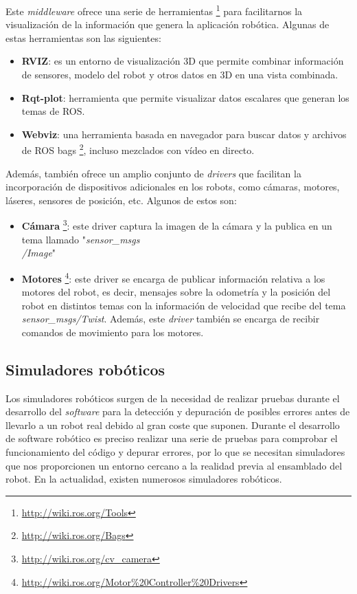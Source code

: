 \documentclass[a4paper, 12pt]{book}
\begin{document}
Este \emph{middleware} ofrece una serie de herramientas \footnote{\url{http://wiki.ros.org/Tools}} para facilitarnos la visualización de la información que genera la aplicación robótica. Algunas de estas herramientas son las siguientes:
\nolinebreak
\begin{itemize}
\itemsep 0em
\item \textbf{RVIZ}: es un entorno de visualización 3D que permite combinar información de sensores, modelo del robot y otros datos en 3D en una vista combinada.
\item \textbf{Rqt-plot}: herramienta que permite visualizar datos escalares que generan los temas de ROS.
\item \textbf{Webviz}: una herramienta basada en navegador para buscar datos y archivos de ROS bags \footnote{\url{http://wiki.ros.org/Bags}}, incluso mezclados con vídeo en directo.
\end{itemize}

Además, también ofrece un amplio conjunto de \emph{drivers} que facilitan la incorporación de dispositivos adicionales en los robots, como cámaras, motores, láseres, sensores de posición, etc. Algunos de estos son:

\begin{itemize}
\itemsep 0em
\item \textbf{Cámara} \footnote{\url{http://wiki.ros.org/cv_camera}}: este driver captura la imagen de la cámara y la publica en un tema llamado "\emph{sensor\_msgs\\/Image}"
\item \textbf{Motores} \footnote{\url{http://wiki.ros.org/Motor\%20Controller\%20Drivers}}: este driver se encarga de publicar información relativa a los motores del robot, es decir, mensajes sobre la odometría y la posición del robot en distintos temas con la información de velocidad que recibe del tema \emph{sensor\_msgs/Twist}. Además, este \emph{driver} también se encarga de recibir comandos de movimiento para los motores.

\end{itemize}

\subsection{Simuladores robóticos}
\label{subsec:simuladores}

Los simuladores robóticos surgen de la necesidad de realizar pruebas durante el desarrollo del \textit{software} para la detección y depuración de posibles errores antes de llevarlo a un robot real debido al gran coste que suponen. Durante el desarrollo de software robótico es preciso realizar una serie de pruebas para comprobar el funcionamiento del código y depurar errores, por lo que se necesitan simuladores que nos proporcionen un entorno cercano a la realidad previa al ensamblado del robot. En la actualidad, existen numerosos simuladores robóticos.
\end{document}
